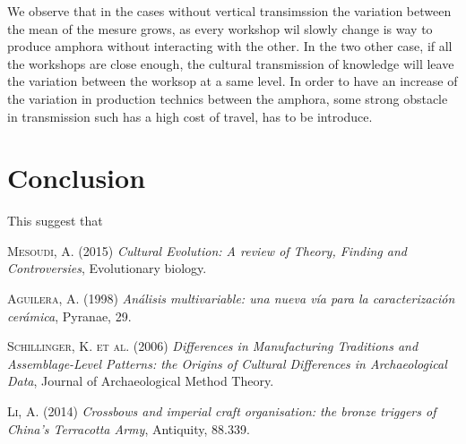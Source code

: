 \documentclass[a4paper]{article}
\begin{document}
    We observe that in the cases without vertical transimssion the variation between the mean of the mesure grows, as every workshop wil slowly change is way to produce amphora without interacting with the other. In the two other case, if all the workshops are close enough, the cultural transmission of knowledge will leave the variation between the worksop at a same level. In order to have an increase of the variation in production technics between the amphora, some strong obstacle in transmission such has a high cost of travel, has to be introduce.

    \section{Conclusion}
    
    This suggest that
 


\begin{thebibliography}{50}
	\textsc{Mesoudi, A. (2015)}
	\textit{Cultural Evolution: A review of Theory, Finding and Controversies}, Evolutionary biology.

	\textsc{Aguilera, A. (1998)}
	\textit{An\'alisis multivariable: una nueva v\'ia para la caracterizaci\'on cer\'amica}, Pyranae, 29.

	\textsc{Schillinger, K. et al. (2006)}
	\textit{Differences in Manufacturing Traditions and Assemblage-Level Patterns: the Origins of Cultural Differences in Archaeological Data}, Journal of Archaeological Method Theory.

	\textsc{Li, A. (2014)}
	\textit{Crossbows and imperial craft organisation: the bronze triggers of China's Terracotta Army}, Antiquity, 88.339.

\end{thebibliography}
\end{document}
